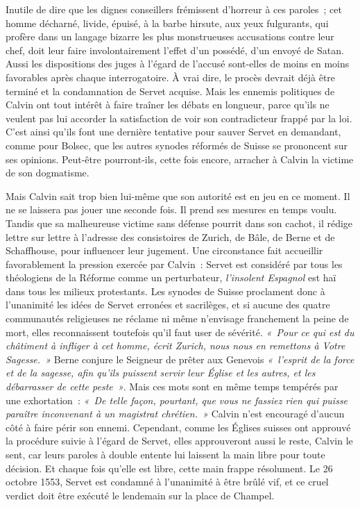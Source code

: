\documentclass[french,twoside]{book} %
\newcommand{\astermono}{\medskip\centerline{\color{rubric}\large\selectfont{\syms ✻}}\medskip\par}%
\begin{document}
\noindent Inutile de dire que les dignes conseillers frémissent d’horreur à ces paroles ; cet homme décharné, livide, épuisé, à la barbe hirsute, aux yeux fulgurants, qui profère dans un langage bizarre les plus monstrueuses accusations contre leur chef, doit leur faire involontairement l’effet d’un possédé, d’un envoyé de Satan. Aussi les dispositions des juges à l’égard de l’accusé sont-elles de moins en moins favorables après chaque interrogatoire. À vrai dire, le procès devrait déjà être terminé et la condamnation de Servet acquise. Mais les ennemis politiques de Calvin ont tout intérêt à faire traîner les débats en longueur, parce qu’ils ne veulent pas lui accorder la satisfaction de voir son contradicteur frappé par la loi. C’est ainsi qu’ils font une dernière tentative pour sauver Servet en demandant, comme pour Bolsec, que les autres synodes réformés de Suisse se prononcent sur ses opinions. Peut-être pourront-ils, cette fois encore, arracher à Calvin la victime de son dogmatisme.\par

\astermono

\noindent Mais Calvin sait trop bien lui-même que son autorité est en jeu en ce moment. Il ne se laissera pas jouer une seconde fois. Il prend ses mesures en temps voulu. Tandis que sa malheureuse victime sans défense pourrit dans son cachot, il rédige lettre sur lettre à l’adresse des consistoires de Zurich, de Bâle, de Berne et de Schaffhouse, pour influencer leur jugement. Une circonstance fait accueillir favorablement la pression exercée par Calvin : Servet est considéré par tous les théologiens de la Réforme comme un perturbateur, \emph{l’insolent Espagnol} est haï dans tous les milieux protestants. Les synodes de Suisse proclament donc à l’unanimité les idées de Servet erronées et sacrilèges, et si aucune des quatre communautés religieuses ne réclame ni même n’envisage franchement la peine de mort, elles reconnaissent toutefois qu’il faut user de sévérité. \emph{« Pour ce qui est du châtiment à infliger à cet homme, écrit Zurich, nous nous en remettons à Votre Sagesse. »} Berne conjure le Seigneur de prêter aux Genevois \emph{« l’esprit de la force et de la sagesse, afin qu’ils puissent servir leur Église et les autres, et les débarrasser de cette peste »}. Mais ces mots sont en même temps tempérés par une exhortation : \emph{« De telle façon, pourtant, que vous ne fassiez rien qui puisse paraître inconvenant à un magistrat chrétien. »} Calvin n’est encouragé d’aucun côté à faire périr son ennemi. Cependant, comme les Églises suisses ont approuvé la procédure suivie à l’égard de Servet, elles approuveront aussi le reste, Calvin le sent, car leurs paroles à double entente lui laissent la main libre pour toute décision. Et chaque fois qu’elle est libre, cette main frappe résolument. Le 26 octobre 1553, Servet est condamné à l’unanimité à être brûlé vif, et ce cruel verdict doit être exécuté le lendemain sur la place de Champel.\par
\end{document}
